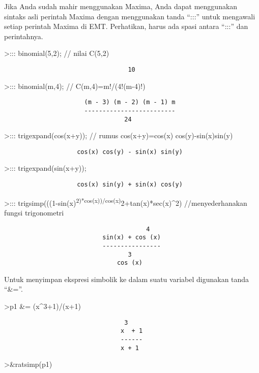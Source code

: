\documentclass[
]{book}
\begin{document}
Jika Anda sudah mahir menggunakan Maxima, Anda dapat menggunakan sintaks asli perintah Maxima dengan menggunakan tanda ``:::'' untuk mengawali setiap perintah Maxima di EMT. Perhatikan, harus ada spasi antara ``:::'' dan perintahnya.

\textgreater::: binomial(5,2); // nilai C(5,2)

\begin{verbatim}
                                  10
\end{verbatim}

\textgreater::: binomial(m,4); // C(m,4)=m!/(4!(m-4)!)

\begin{verbatim}
                      (m - 3) (m - 2) (m - 1) m
                      -------------------------
                                 24
\end{verbatim}

\textgreater::: trigexpand(cos(x+y)); // rumus cos(x+y)=cos(x) cos(y)-sin(x)sin(y)

\begin{verbatim}
                    cos(x) cos(y) - sin(x) sin(y)
\end{verbatim}

\textgreater::: trigexpand(sin(x+y));

\begin{verbatim}
                    cos(x) sin(y) + sin(x) cos(y)
\end{verbatim}

\textgreater::: trigsimp(((1-sin(x)\textsuperscript{2)*cos(x))/cos(x)}2+tan(x)*sec(x)\^{}2) //menyederhanakan fungsi trigonometri

\begin{verbatim}
                                       4
                           sin(x) + cos (x)
                           ----------------
                                  3
                               cos (x)
\end{verbatim}

Untuk menyimpan ekspresi simbolik ke dalam suatu variabel digunakan tanda ``\&=''.

\textgreater p1 \&= (x\^{}3+1)/(x+1)

\begin{verbatim}
                                 3
                                x  + 1
                                ------
                                x + 1
\end{verbatim}

\textgreater\&ratsimp(p1)
\end{document}
